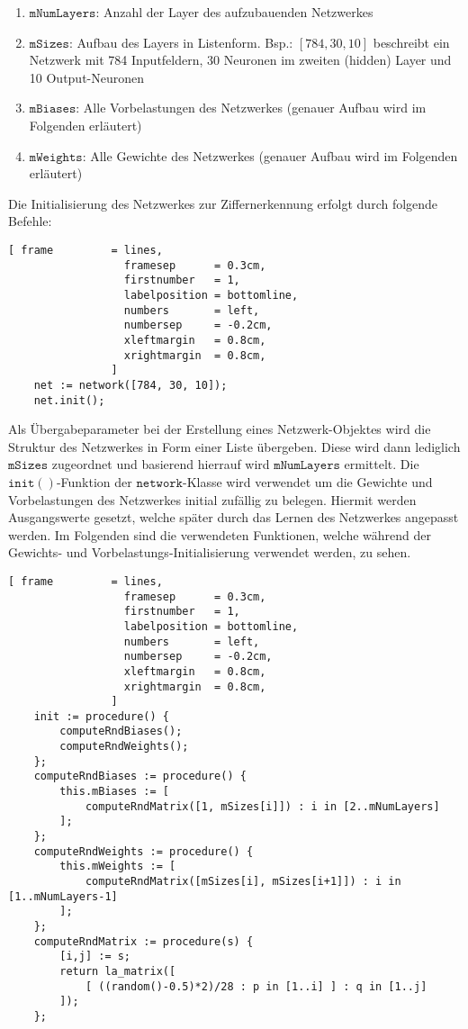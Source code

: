 \begin{enumerate}
\item $\mathtt{mNumLayers}$: Anzahl der Layer des aufzubauenden Netzwerkes 
\item $\mathtt{mSizes}$: Aufbau des Layers in Listenform. Bsp.: $[784, 30, 10]$ beschreibt ein Netzwerk mit 784 Inputfeldern, 30 Neuronen im zweiten (hidden) Layer und 10 Output-Neuronen
\item $\mathtt{mBiases}$: Alle Vorbelastungen des Netzwerkes (genauer Aufbau wird im Folgenden erläutert)
\item $\mathtt{mWeights}$: Alle Gewichte des Netzwerkes (genauer Aufbau wird im Folgenden erläutert)
\end{enumerate}

\noindent
Die Initialisierung des Netzwerkes zur Ziffernerkennung erfolgt durch folgende Befehle:
\begin{Verbatim}[ frame         = lines, 
                  framesep      = 0.3cm, 
                  firstnumber   = 1,
                  labelposition = bottomline,
                  numbers       = left,
                  numbersep     = -0.2cm,
                  xleftmargin   = 0.8cm,
                  xrightmargin  = 0.8cm,
                ]
    net := network([784, 30, 10]);
    net.init();
\end{Verbatim}
Als Übergabeparameter bei der Erstellung eines Netzwerk-Objektes wird die Struktur des Netzwerkes in Form einer Liste übergeben. Diese wird dann lediglich $\mathtt{mSizes}$ zugeordnet und basierend hierrauf wird $\mathtt{mNumLayers}$ ermittelt.
Die $\mathtt{init()}$-Funktion der $\mathtt{network}$-Klasse wird verwendet um die Gewichte und Vorbelastungen des Netzwerkes initial zufällig zu belegen. Hiermit werden Ausgangswerte gesetzt, welche später durch das Lernen des Netzwerkes angepasst werden.
Im Folgenden sind die verwendeten Funktionen, welche während der Gewichts- und Vorbelastungs-Initialisierung verwendet werden, zu sehen.
\begin{Verbatim}[ frame         = lines, 
                  framesep      = 0.3cm, 
                  firstnumber   = 1,
                  labelposition = bottomline,
                  numbers       = left,
                  numbersep     = -0.2cm,
                  xleftmargin   = 0.8cm,
                  xrightmargin  = 0.8cm,
                ]
    init := procedure() {
        computeRndBiases();
        computeRndWeights();
    };
    computeRndBiases := procedure() {
        this.mBiases := [ 
            computeRndMatrix([1, mSizes[i]]) : i in [2..mNumLayers] 
        ];
    };
    computeRndWeights := procedure() {
        this.mWeights := [ 
            computeRndMatrix([mSizes[i], mSizes[i+1]]) : i in [1..mNumLayers-1] 
        ];
    };
    computeRndMatrix := procedure(s) {
        [i,j] := s;
        return la_matrix([
            [ ((random()-0.5)*2)/28 : p in [1..i] ] : q in [1..j]
        ]);
    };
\end{Verbatim}

